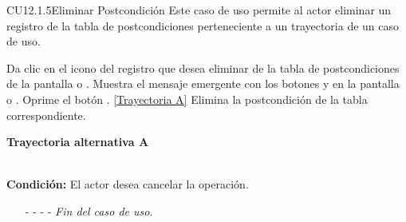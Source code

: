 	\begin{UseCase}{CU12.1.5}{Eliminar Postcondición}{
		Este caso de uso permite al actor eliminar un registro de la tabla de postcondiciones perteneciente a un trayectoria de un caso de uso.
	}
\end{UseCase}
\begin{UCtrayectoria}
	\UCpaso[\UCactor] Da clic en el icono \eliminar del registro que desea eliminar de la tabla de postcondiciones de la pantalla  o .
	\UCpaso[\UCsist] Muestra el mensaje emergente  con los botones  y  en la pantalla  o .
	\UCpaso[\UCactor] Oprime el botón . \hyperlink{CU12-1-5:TAA}{[Trayectoria A]}
	\UCpaso[\UCsist] Elimina la postcondición de la tabla correspondiente.
\end{UCtrayectoria}		
\hypertarget{CU12-1-5:TAA}{\textbf{Trayectoria alternativa A}}\\
\noindent \textbf{Condición:} El actor desea cancelar la operación.
\begin{enumerate}
	\UCpaso[\UCactor] Solicita cancelar la operación oprimiendo el botón  de la pantalla .
	\UCpaso[\UCsist] Muestra la pantalla  o .
	\item[- -] - - {\em {Fin del caso de uso}}.%
\end{enumerate}
